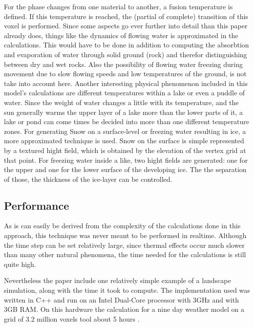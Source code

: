 For the phase changes from one material to another, a fusion temperature is defined. If this temperature is reached, the (partial of complete) transition of this voxel is performed. Since some aspects go ever further into detail than this paper already does, things like the dynamics of flowing water is approximated in the calculations. This would have to be done in addition to computing the absorbtion and evaporation of water through solid ground (rock) and therefor distinguishing between dry and wet rocks. Also the possibility of flowing water freezing during movement due to slow flowing speeds and low temperatures of the ground, is not take into account here. Another interesting physical phenomenon included in this model's calculations are different temperatures within a lake or even a puddle of water. Since the weight of water changes a little with its temperature, and the sun generally warms the upper layer of a lake more than the lower parts of it, a lake or pond can come times be decided into more than one different temperature zones.
For generating Snow on a surface-level or freezing water resulting in ice, a more approximated technique is used. Snow on the surface is simple represented by a textured hight field, which is obtained by the elevation of the vertex grid at that point. For freezing water inside a like, two hight fields are generated: one for the upper and one for the lower surface of the developing ice. The the separation of those, the thickness of the ice-layer can be controlled.

\subsection{Performance}
As is can easily be derived from the complexity of the calculations done in this approach, this technique was never meant to be performed in realtime. Although the time step can be set relatively large, since thermal effects occur much slower than many other natural phenomena, the time needed for the calculations is still quite high.

Nevertheless the paper include one relatively simple example of a landscape simulation, along with the time it took to compute. The implementation used was written in C++ and run on an Intel Dual-Core processor with 3GHz and with 3GB RAM. On this hardware the calculation for a nine day weather model on a grid of 3.2 million voxels tool about 5 hours \cite{benes2001layered}.